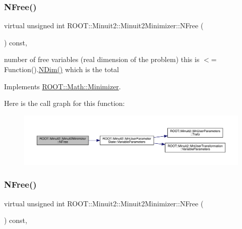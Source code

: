 \subsubsection{\texorpdfstring{NFree()}{NFree()}\hspace{0.1cm}{\footnotesize\ttfamily [1/2]}}
{\footnotesize\ttfamily virtual unsigned int R\+O\+O\+T\+::\+Minuit2\+::\+Minuit2\+Minimizer\+::\+N\+Free (\begin{DoxyParamCaption}{ }\end{DoxyParamCaption}) const\hspace{0.3cm}{\ttfamily [inline]}, {\ttfamily [virtual]}}

number of free variables (real dimension of the problem) this is $<$= Function().\mbox{\hyperlink{classROOT_1_1Minuit2_1_1Minuit2Minimizer_a6ed2c7d99296e222f0f43295e302eb9e}{N\+Dim()}} which is the total 

Implements \mbox{\hyperlink{classROOT_1_1Math_1_1Minimizer_a75a7cd8dc0d764ecc9d82dd8f83aab24}{R\+O\+O\+T\+::\+Math\+::\+Minimizer}}.

Here is the call graph for this function\+:
\nopagebreak
\begin{figure}[H]
\begin{center}
\leavevmode
\includegraphics[width=350pt]{d0/d9c/classROOT_1_1Minuit2_1_1Minuit2Minimizer_a0aa136c5a94d1e5c6bfcbfb98da7ad2d_cgraph}
\end{center}
\end{figure}
\mbox{\label{classROOT_1_1Minuit2_1_1Minuit2Minimizer_a0aa136c5a94d1e5c6bfcbfb98da7ad2d}} 
\subsubsection{\texorpdfstring{NFree()}{NFree()}\hspace{0.1cm}{\footnotesize\ttfamily [2/2]}}
{\footnotesize\ttfamily virtual unsigned int R\+O\+O\+T\+::\+Minuit2\+::\+Minuit2\+Minimizer\+::\+N\+Free (\begin{DoxyParamCaption}{ }\end{DoxyParamCaption}) const\hspace{0.3cm}{\ttfamily [inline]}, {\ttfamily [virtual]}}

